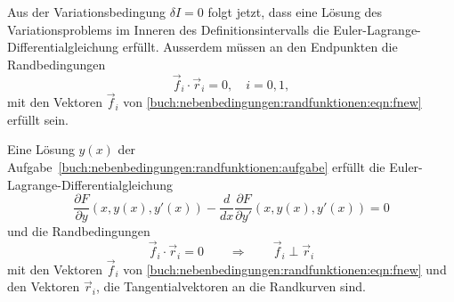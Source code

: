 Aus der Variationsbedingung $\delta I=0$ folgt jetzt, dass eine
Lösung des Variationsproblems im Inneren des Definitionsintervalls
die Euler-Lagrange-Differentialgleichung erfüllt.
Ausserdem müssen an den Endpunkten die Randbedingungen
\begin{equation}
\vec{f}_i\cdot\vec{r}_i
=
0,\quad i=0,1,
\end{equation}
mit den Vektoren $\vec{f}_i$ von
\eqref{buch:nebenbedingungen:randfunktionen:eqn:fnew}
erfüllt sein.

\begin{satz}
\label{buch:nebenbedingungen:randfunktionen:satz:loesung}
Eine Lösung $y(x)$ der
Aufgabe~\ref{buch:nebenbedingungen:randfunktionen:aufgabe}
erfüllt die Euler-Lagrange-Differentialgleichung
\begin{equation}
\frac{\partial F}{\partial y}(x,y(x),y'(x))
-
\frac{d}{dx}
\frac{\partial F}{\partial y'}(x,y(x),y'(x))
=
0
\end{equation}
und die Randbedingungen
\[
\vec{f}_i\cdot \vec{r}_i =  0
\qquad\Rightarrow\qquad
\vec{f}_i\perp\vec{r}_i
\]
mit den Vektoren $\vec{f}_i$ von
\eqref{buch:nebenbedingungen:randfunktionen:eqn:fnew}
und den Vektoren $\vec{r}_i$, die Tangentialvektoren an die Randkurven
sind.
\end{satz}


